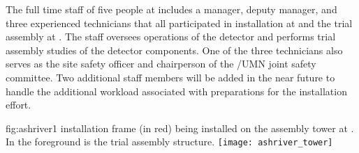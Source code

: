 The full time staff of five people at 
includes a manager, deputy manager, and three experienced technicians
that all participated in  installation at  and
the  trial assembly at .  The staff
oversees operations of the  detector and performs trial
assembly studies of the  detector components.  One of the
three technicians also serves as the site safety officer and
chairperson of the /UMN joint safety committee.  Two additional staff
members will be added in the near future to handle the additional
workload associated with preparations for the 
installation effort.
\begin{dunefigure}
  {fig:ashriver1}
  { installation frame (in red) being installed on the
   assembly tower at . In the foreground is
  the  trial assembly structure.}
   \texttt{[image: ashriver\_tower]}
\end{dunefigure}

